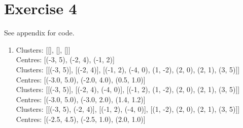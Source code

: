 \documentclass[12pt]{article}
\begin{document}
\section*{Exercise 4}
See \refname{appendix} for code.
\begin{enumerate}[label=(\alph*)]
	\item	Clusters: [[], [], []] \\
			Centres: [(-3, 5), (-2, 4), (-1, 2)] \\

			Clusters: [[(-3, 5)], [(-2, 4)], [(-1, 2), (-4, 0), (1, -2), (2, 0), (2, 1), (3, 5)]] \\
			Centres: [(-3.0, 5.0), (-2.0, 4.0), (0.5, 1.0)] \\

			Clusters: [[(-3, 5)], [(-2, 4), (-4, 0)], [(-1, 2), (1, -2), (2, 0), (2, 1), (3, 5)]] \\
			Centres: [(-3.0, 5.0), (-3.0, 2.0), (1.4, 1.2)] \\

			Clusters: [[(-3, 5), (-2, 4)], [(-1, 2), (-4, 0)], [(1, -2), (2, 0), (2, 1), (3, 5)]] \\
			Centres: [(-2.5, 4.5), (-2.5, 1.0), (2.0, 1.0)] \\


\end{enumerate}
\end{document}
